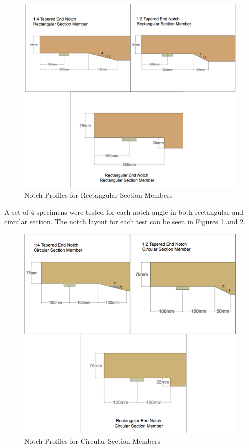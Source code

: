\documentclass[11pt,a4paper]{article}
\numberwithin{equation}{subsection}
\begin{document}
\vspace*{\baselineskip}

\begin{figure}[h]
	\begin{center}
		\includegraphics[scale=0.4]{Notch_Angles}
	\end{center}
	\caption{Notch Profiles for Rectangular Section Members}
	\label{fig:Rectangular2}
\end{figure}
\pagebreak

\noindent
A set of 4 specimens were tested for each notch angle in both rectangular and circular section. The notch layout for each test can be seen in Figures \ref{fig:Rectangular2} and \ref{fig:Circular}.
\vspace*{\baselineskip}
\begin{figure}[h]
	\begin{center}
		\includegraphics[scale=0.55]{Circular_Notch_Angles}
	\end{center}
	\caption{Notch Profiles for Circular Section Members}
	\label{fig:Circular}
\end{figure}
\end{document}
